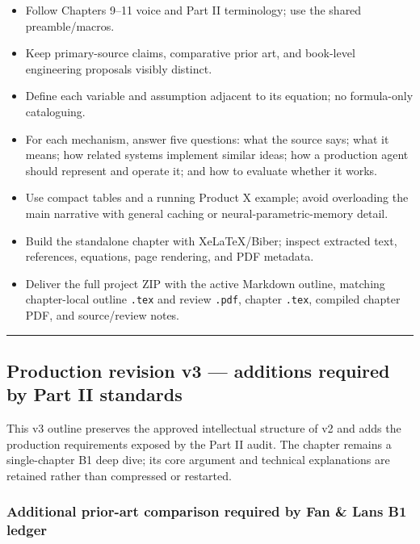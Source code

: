 \begin{itemize}
\tightlist
\item
  Follow Chapters 9--11 voice and Part II terminology; use the shared preamble/macros.
\item
  Keep primary-source claims, comparative prior art, and book-level engineering proposals visibly distinct.
\item
  Define each variable and assumption adjacent to its equation; no formula-only cataloguing.
\item
  For each mechanism, answer five questions: what the source says; what it means; how related systems implement similar ideas; how a production agent should represent and operate it; and how to evaluate whether it works.
\item
  Use compact tables and a running Product X example; avoid overloading the main narrative with general caching or neural-parametric-memory detail.
\item
  Build the standalone chapter with XeLaTeX/Biber; inspect extracted text, references, equations, page rendering, and PDF metadata.
\item
  Deliver the full project ZIP with the active Markdown outline, matching chapter-local outline \texttt{.tex} and review \texttt{.pdf}, chapter \texttt{.tex}, compiled chapter PDF, and source/review notes.
\end{itemize}

\begin{center}\rule{0.5\linewidth}{0.5pt}\end{center}

\subsection{Production revision v3 --- additions required by Part II standards}\label{production-revision-v3--additions-required-by-part-ii-standards}

This v3 outline preserves the approved intellectual structure of v2 and adds the production requirements exposed by the Part II audit. The chapter remains a single-chapter B1 deep dive; its core argument and technical explanations are retained rather than compressed or restarted.

\subsubsection{Additional prior-art comparison required by Fan \& Lan\textquotesingle s B1 ledger}\label{additional-prior-art-comparison-required-by-fan--lans-b1-ledger}

